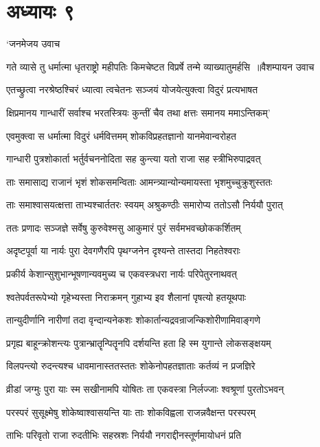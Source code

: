\chapter{अध्यायः ९}
\twolineshloka
{`जनमेजय उवाच}
{}


\threelineshloka
{गते व्यासे तु धर्मात्मा धृतराष्ट्रो महीपतिः}
{किमचेष्टत विप्रर्षे तन्मे व्याख्यातुमर्हसि ॥वैशम्पायन उवाच}
{}


\twolineshloka
{एतच्छ्रुत्वा नरश्रेष्ठश्चिरं ध्यात्वा त्वचेतनः}
{सञ्जयं योजयेत्युक्त्वा विदुरं प्रत्यभाषत}


\twolineshloka
{क्षिप्रमानय गान्धारीं सर्वाश्च भरतस्त्रियः}
{कुन्तीं चैव तथा क्षत्तः समानय ममाऽन्तिकम्'}


\twolineshloka
{एवमुक्त्वा स धर्मात्मा विदुरं धर्मवित्तमम्}
{शोकविप्रहतज्ञानो यानमेवान्वरोहत}


\twolineshloka
{गान्धारी पुत्रशोकार्ता भर्तुर्वचननोदिता}
{सह कुन्त्या यतो राजा सह स्त्रीभिरुपाद्रवत्}


\twolineshloka
{ताः समासाद्य राजानं भृशं शोकसमन्विताः}
{आमन्त्र्यान्योन्यमायस्ता भृशमुच्चुक्रुशुस्ततः}


\twolineshloka
{ताः समाश्वासयत्क्षत्ता ताभ्यश्चार्ततरः स्वयम्}
{अश्रुकण्ठीः समारोप्य ततोऽसौ निर्ययौ पुरात्}


\twolineshloka
{ततः प्रणादः सञ्जज्ञे सर्वेषु कुरुवेश्मसु}
{आकुमारं पुरं सर्वमभवच्छोककर्शितम्}


\twolineshloka
{अदृष्टपूर्वा या नार्यः पुरा देवगणैरपि}
{पृथग्जनेन दृश्यन्ते तास्तदा निहतेश्वराः}


\twolineshloka
{प्रकीर्य केशान्सुशुभान्भूषणान्यवमुच्य च}
{एकवस्त्रधरा नार्यः परिपेतुरनाथवत्}


\twolineshloka
{श्वतेपर्वतरूपेभ्यो गृहेभ्यस्ता निराक्रमन्}
{गुहाभ्य इव शैलानां पृषत्यो हतयूथपाः}


\twolineshloka
{तान्युदीर्णानि नारीणां तदा वृन्दान्यनेकशः}
{शोकार्तान्यद्रवन्राजन्किशोरीणामिवाङ्गणे}


\twolineshloka
{प्रगृह्य बाहून्क्रोशन्त्यः पुत्रान्भ्रातॄन्पितॄनपि}
{दर्शयन्ति हता हि स्म युगान्ते लोकसङ्क्षयम्}


\twolineshloka
{विलपन्त्यो रुदन्त्यश्च धावमानास्ततस्ततः}
{शोकेनोपहतज्ञाताः कर्तव्यं न प्रजज्ञिरे}


\twolineshloka
{व्रीडां जग्मुः पुरा याः स्म सखीनामपि योषितः}
{ता एकवस्त्रा निर्लज्जाः श्वश्रूणां पुरतोऽभवन्}


\twolineshloka
{परस्परं सुसूक्ष्मेषु शोकेष्वाश्वासयन्ति याः}
{ताः शोकविह्वला राजन्नवैक्षन्त परस्परम्}


\twolineshloka
{ताभिः परिवृतो राजा रुदतीभिः सहस्रशः}
{निर्ययौ नगराद्दीनस्तूर्णमायोधनं प्रति}


